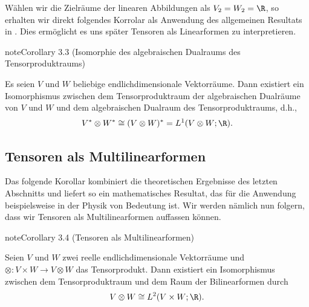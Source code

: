\documentclass[letterpaper,10pt,english]{jupyterBook}
\begin{document}
\sphinxAtStartPar
Wählen wir die Zielräume der linearen Abbildungen als \(V_2 = W_2 = \R\), so erhalten wir direkt folgendes Korrolar als Anwendung des allgemeinen Resultats in {\hyperref[\detokenize{vektoranalysis/tensor:thm:pIsomorphismus}]{}}.
Dies ermöglicht es uns später Tensoren als Linearformen zu interpretieren.
\label{vektoranalysis/tensor:cor:tensorenLinearformen}
\begin{sphinxadmonition}{note}{Corollary 3.3 (Isomorphie des algebraischen Dualraums des Tensorproduktraums)}



\sphinxAtStartPar
Es seien \(V\) und \(W\) beliebige endlich\sphinxhyphen{}dimensionale Vektorräume.
Dann existiert ein Isomorphismus zwischen dem Tensorproduktraum der algebraischen Dualräume von \(V\) und \(W\) und dem algebraischen Dualraum des Tensorproduktraums, d.h.,
\begin{equation*}
\begin{split}V^\ast \otimes W^\ast \cong (V\otimes W)^\ast = L^1(V \otimes W; \R).\end{split}
\end{equation*}\end{sphinxadmonition}


\subsection{Tensoren als Multilinearformen}
\label{\detokenize{vektoranalysis/tensor:tensoren-als-multilinearformen}}
\sphinxAtStartPar
Das folgende Korollar kombiniert die theoretischen Ergebnisse des letzten Abschnitts und liefert so ein mathematisches Resultat, das für die Anwendung beispielsweise in der Physik von Bedeutung ist.
Wir werden nämlich nun folgern, dass wir Tensoren als Multilinearformen auffassen können.
\label{vektoranalysis/tensor:cor:tensorMultilinearform}
\begin{sphinxadmonition}{note}{Corollary 3.4 (Tensoren als Multilinearformen)}



\sphinxAtStartPar
Seien \(V\) und \(W\) zwei reelle endlich\sphinxhyphen{}dimensionale Vektorräume und \(\otimes \colon V \times W \rightarrow V \otimes W\) das Tensorprodukt.
Dann existiert ein Isomorphismus zwischen dem Tensorproduktraum und dem Raum der Bilinearformen durch
\begin{equation*}
\begin{split}V \otimes W \cong L^2(V \times W; \R).\end{split}
\end{equation*}\end{sphinxadmonition}
\end{document}
